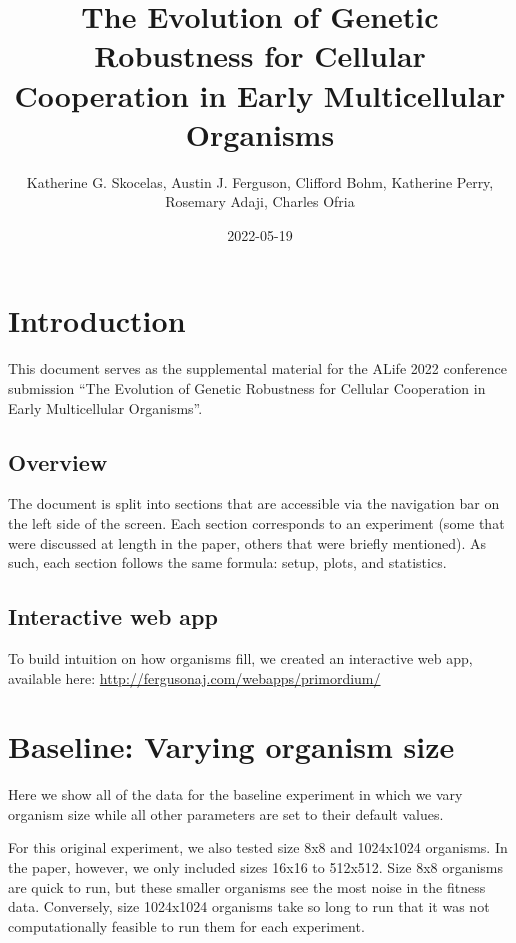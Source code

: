 \documentclass[
]{book}
\title{The Evolution of Genetic Robustness for Cellular Cooperation in Early Multicellular Organisms}
\author{Katherine G. Skocelas, Austin J. Ferguson, Clifford Bohm, Katherine Perry, Rosemary Adaji, Charles Ofria}
\date{2022-05-19}
\begin{document}
\maketitle

{
\setcounter{tocdepth}{1}
\tableofcontents
}
\hypertarget{introduction}{%
\chapter{Introduction}\label{introduction}}

This document serves as the supplemental material for the ALife 2022 conference submission ``The Evolution of Genetic Robustness for Cellular Cooperation in Early Multicellular Organisms''.

\hypertarget{overview}{%
\section{Overview}\label{overview}}

The document is split into sections that are accessible via the navigation bar on the left side of the screen.
Each section corresponds to an experiment (some that were discussed at length in the paper, others that were briefly mentioned).
As such, each section follows the same formula: setup, plots, and statistics.

\hypertarget{interactive-web-app}{%
\section{Interactive web app}\label{interactive-web-app}}

To build intuition on how organisms fill, we created an interactive web app, available here: \url{http://fergusonaj.com/webapps/primordium/}

\hypertarget{baseline-varying-organism-size}{%
\chapter{Baseline: Varying organism size}\label{baseline-varying-organism-size}}

Here we show all of the data for the baseline experiment in which we vary organism size while all other parameters are set to their default values.

For this original experiment, we also tested size 8x8 and 1024x1024 organisms.
In the paper, however, we only included sizes 16x16 to 512x512.
Size 8x8 organisms are quick to run, but these smaller organisms see the most noise in the fitness data.
Conversely, size 1024x1024 organisms take so long to run that it was not computationally feasible to run them for each experiment.
\end{document}
